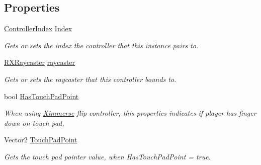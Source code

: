 \subsection*{Properties}
\begin{DoxyCompactItemize}
\item 
\mbox{\hyperlink{namespace_ximmerse_1_1_rhino_x_a78c4d1657dc299dc9f91fad0ef234666}{Controller\+Index}} \mbox{\hyperlink{class_ximmerse_1_1_rhino_x_1_1_r_x_controller_a74749f7219b9eca23f4540de4c98fc48}{Index}}
\begin{DoxyCompactList}\small\item\em Gets or sets the index the controller that this instance pairs to. \end{DoxyCompactList}\item 
\mbox{\hyperlink{class_ximmerse_1_1_rhino_x_1_1_r_x_raycaster}{R\+X\+Raycaster}} \mbox{\hyperlink{class_ximmerse_1_1_rhino_x_1_1_r_x_controller_a777648a528c40d7221682ba898562c95}{raycaster}}
\begin{DoxyCompactList}\small\item\em Gets or sets the raycaster that this controller bounds to. \end{DoxyCompactList}\item 
bool \mbox{\hyperlink{class_ximmerse_1_1_rhino_x_1_1_r_x_controller_ac7f62ba234dae32195cd95530a8e2879}{Has\+Touch\+Pad\+Point}}
\begin{DoxyCompactList}\small\item\em When using \mbox{\hyperlink{namespace_ximmerse}{Ximmerse}} flip controller, this properties indicates if player has finger down on touch pad. \end{DoxyCompactList}\item 
Vector2 \mbox{\hyperlink{class_ximmerse_1_1_rhino_x_1_1_r_x_controller_ae9a2c7113e7cdc7d802b500d628a2c1c}{Touch\+Pad\+Point}}
\begin{DoxyCompactList}\small\item\em Gets the touch pad pointer value, when Has\+Touch\+Pad\+Point = true. \end{DoxyCompactList}\end{DoxyCompactItemize}



